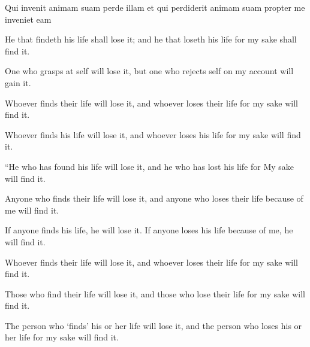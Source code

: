 			\begin{framed}
			\scriptsize
				\begin{compactdesc}
					\item[SBLG]  \hyperref[PSUCHE]{}  \hyperref[PSUCHE]{} 
					\item[BSV] Qui invenit animam suam perde illam et qui perdiderit animam suam propter me inveniet eam
					\item[ASV] He that findeth his life shall lose it; and he that loseth his life for my sake shall find it.
					\item[AB 1986] One who grasps at self will lose it, but one who rejects self on my account will gain it.
					\item[SPNT] Whoever finds their life will lose it, and whoever loses their life for my sake will find it.
					\item[ESV] Whoever finds his life will lose it, and whoever loses his life for my sake will find it.
					\item[NASB] ``He who has found his life will lose it, and he who has lost his life for My sake will find it.
					\item[NICNT (France)] Anyone who finds their life will lose it, and anyone who loses their life because of me will find it.
					\item[NIRV] If anyone finds his life, he will lose it. If anyone loses his life because of me, he will find it.
					\item[NIV] Whoever finds their life will lose it, and whoever loses their life for my sake will find it.
					\item[NRSV] Those who find their life will lose it, and those who lose their life for my sake will find it.
					\item[WBC 33a PDF 367] The person who `finds' his or her life will lose it, and the person who loses his or her life for my sake will find it.
				\end{compactdesc}
			\end{framed}

